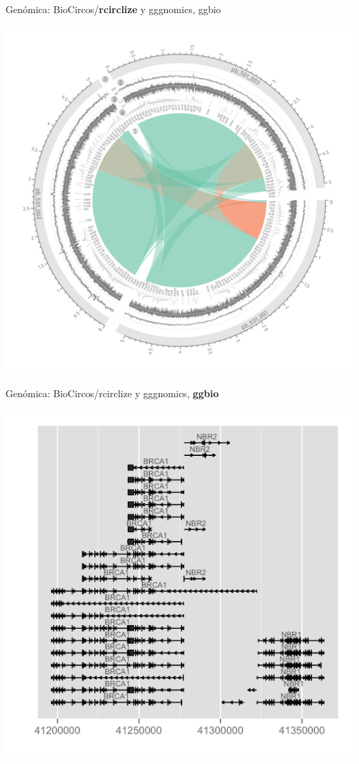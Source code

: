 \documentclass[ignorenonframetext,]{beamer}
\begin{document}
\begin{frame}{Genómica: BioCircos/\textbf{rcirclize} y gggnomics, ggbio}
\protect\hypertarget{genuxf3mica-biocircosrcirclize-y-gggnomics-ggbio}{}

\begin{center}\includegraphics[width=0.95\linewidth]{rcirclize} \end{center}

\end{frame}

\begin{frame}{Genómica: BioCircos/rcirclize y gggnomics, \textbf{ggbio}}
\protect\hypertarget{genuxf3mica-biocircosrcirclize-y-gggnomics-ggbio-1}{}

\begin{center}\includegraphics[width=0.95\linewidth]{ggnomics_1} \end{center}

\end{frame}
\end{document}
